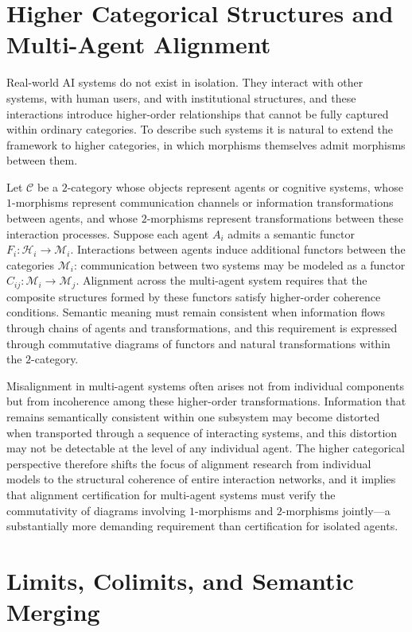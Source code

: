\documentclass[12pt]{article}
\theoremstyle{definition}
\begin{document}
\section{Higher Categorical Structures and Multi-Agent Alignment}

Real-world AI systems do not exist in isolation. They interact with other
systems, with human users, and with institutional structures, and these
interactions introduce higher-order relationships that cannot be fully captured
within ordinary categories. To describe such systems it is natural to extend
the framework to higher categories, in which morphisms themselves admit
morphisms between them.

Let $\mathcal{C}$ be a $2$-category whose objects represent agents or cognitive
systems, whose $1$-morphisms represent communication channels or information
transformations between agents, and whose $2$-morphisms represent
transformations between these interaction processes. Suppose each agent $A_i$
admits a semantic functor $F_i : \mathcal{H}_i \to \mathcal{M}_i$.
Interactions between agents induce additional functors between the categories
$\mathcal{M}_i$: communication between two systems may be modeled as a functor
$C_{ij} : \mathcal{M}_i \to \mathcal{M}_j$. Alignment across the multi-agent
system requires that the composite structures formed by these functors satisfy
higher-order coherence conditions. Semantic meaning must remain consistent when
information flows through chains of agents and transformations, and this
requirement is expressed through commutative diagrams of functors and natural
transformations within the $2$-category.

Misalignment in multi-agent systems often arises not from individual components
but from incoherence among these higher-order transformations. Information that
remains semantically consistent within one subsystem may become distorted when
transported through a sequence of interacting systems, and this distortion may
not be detectable at the level of any individual agent. The higher categorical
perspective therefore shifts the focus of alignment research from individual
models to the structural coherence of entire interaction networks, and it implies
that alignment certification for multi-agent systems must verify the
commutativity of diagrams involving $1$-morphisms and $2$-morphisms jointly---a
substantially more demanding requirement than certification for isolated agents.

\section{Limits, Colimits, and Semantic Merging}
\end{document}
